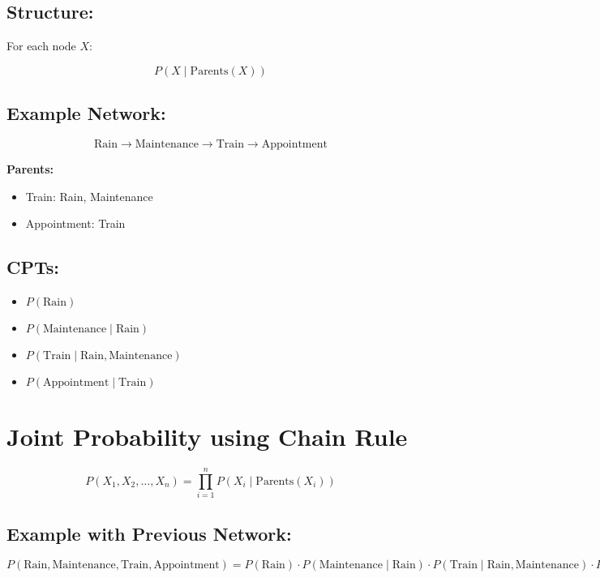 \subsection*{Structure:}

For each node \( X \):

\[
P(X \mid \text{Parents}(X))
\]

\subsection*{Example Network:}

\[
\text{Rain} \rightarrow \text{Maintenance} \rightarrow \text{Train} \rightarrow \text{Appointment}
\]

\textbf{Parents:}
\begin{itemize}
    \item Train: Rain, Maintenance
    \item Appointment: Train
\end{itemize}

\subsection*{CPTs:}
\begin{itemize}
    \item \( P(\text{Rain}) \)
    \item \( P(\text{Maintenance} \mid \text{Rain}) \)
    \item \( P(\text{Train} \mid \text{Rain}, \text{Maintenance}) \)
    \item \( P(\text{Appointment} \mid \text{Train}) \)
\end{itemize}

\begin{center}
\end{center}



\section{Joint Probability using Chain Rule}

\[
P(X_1, X_2, \ldots, X_n) = \prod_{i=1}^n P(X_i \mid \text{Parents}(X_i))
\]

\subsection*{Example with Previous Network:}

\[
P(\text{Rain}, \text{Maintenance}, \text{Train}, \text{Appointment}) = P(\text{Rain}) \cdot P(\text{Maintenance} \mid \text{Rain}) \cdot P(\text{Train} \mid \text{Rain}, \text{Maintenance}) \cdot P(\text{Appointment} \mid \text{Train})
\]


